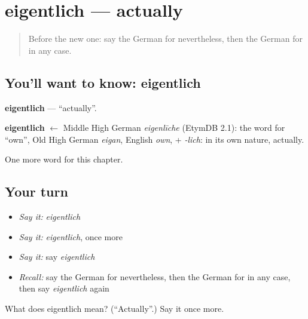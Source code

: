 \section[eigentlich]{eigentlich — actually}

\label{lesson:GE-C250-eigentlich}



\begin{quote}
Before the new one: say the German for nevertheless, then the German for in any case.
\end{quote}

\subsection*{You'll want to know: eigentlich}
\textbf{eigentlich} — \textquotedblleft{}actually\textquotedblright{}.

\begin{cousinweb}
\textbf{eigentlich} $\leftarrow$ Middle High German \emph{eigenlīche} (EtymDB 2.1): the word for \textquotedblleft{}own\textquotedblright{}, Old High German \emph{eigan}, English \emph{own}, + \emph{-lich}: in its own nature, actually.
\end{cousinweb}

\begin{grammarlens}[title={What you've built}]
One more word for this chapter.
\end{grammarlens}

\subsection*{Your turn}
\begin{itemize}
\raggedright
  \item \emph{Say it:} \emph{eigentlich}
  \item \emph{Say it:} \emph{eigentlich}, once more
  \item \emph{Say it:} say \emph{eigentlich}
  \item \emph{Recall:} say the German for nevertheless, then the German for in any case, then say \emph{eigentlich} again
\end{itemize}

\begin{tcolorbox}[breakable,colback=teal!4,colframe=teal!35!black,title={Before you move on}]
What does eigentlich mean? (\textquotedblleft{}Actually\textquotedblright{}.) Say it once more.
\end{tcolorbox}

